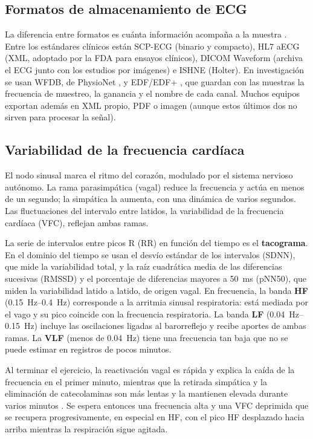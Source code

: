 \subsection{Formatos de almacenamiento de ECG}
\label{sec:formatos}
La diferencia entre formatos es cuánta información acompaña a la muestra \parencite{bond2011}. Entre los estándares clínicos están SCP-ECG (binario y compacto), HL7 aECG (XML, adoptado por la FDA para ensayos clínicos), DICOM Waveform (archiva el ECG junto con los estudios por imágenes) e ISHNE (Holter). En investigación se usan WFDB, de PhysioNet \parencite{goldberger2000}, y EDF/EDF+ \parencite{kemp2003}, que guardan con las muestras la frecuencia de muestreo, la ganancia y el nombre de cada canal. Muchos equipos exportan además en XML propio, PDF o imagen (aunque estos últimos dos no sirven para procesar la señal).

\subsection{Variabilidad de la frecuencia cardíaca}
\label{sec:hrv}
El nodo sinusal marca el ritmo del corazón, modulado por el sistema nervioso autónomo. La rama parasimpática (vagal) reduce la frecuencia y actúa en menos de un segundo; la simpática la aumenta, con una dinámica de varios segundos. Las fluctuaciones del intervalo entre latidos, la variabilidad de la frecuencia cardíaca (VFC), reflejan ambas ramas.

La serie de intervalos entre picos R (RR) en función del tiempo es el \textbf{tacograma}. En el dominio del tiempo se usan el desvío estándar de los intervalos (SDNN), que mide la variabilidad total, y la raíz cuadrática media de las diferencias sucesivas (RMSSD) y el porcentaje de diferencias mayores a \SI{50}{\milli\second} (pNN50), que miden la variabilidad latido a latido, de origen vagal. En frecuencia, la banda \textbf{HF} (\SIrange{0.15}{0.4}{\hertz}) corresponde a la arritmia sinusal respiratoria: está mediada por el vago y su pico coincide con la frecuencia respiratoria. La banda \textbf{LF} (\SIrange{0.04}{0.15}{\hertz}) incluye las oscilaciones ligadas al barorreflejo y recibe aportes de ambas ramas. La \textbf{VLF} (menos de \SI{0.04}{\hertz}) tiene una frecuencia tan baja que no se puede estimar en registros de pocos minutos.

Al terminar el ejercicio, la reactivación vagal es rápida y explica la caída de la frecuencia en el primer minuto, mientras que la retirada simpática y la eliminación de catecolaminas son más lentas y la mantienen elevada durante varios minutos \parencite{imai1994,michael2017}. Se espera entonces una frecuencia alta y una VFC deprimida que se recupera progresivamente, en especial en HF, con el pico HF desplazado hacia arriba mientras la respiración sigue agitada.
